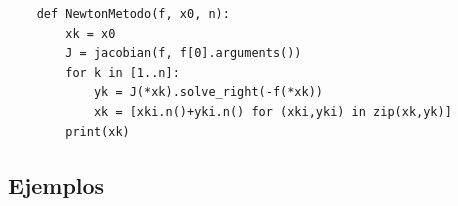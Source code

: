 

\begin{verbatim}
	def NewtonMetodo(f, x0, n):
		xk = x0
		J = jacobian(f, f[0].arguments())
		for k in [1..n]:
			yk = J(*xk).solve_right(-f(*xk))
			xk = [xki.n()+yki.n() for (xki,yki) in zip(xk,yk)]
		print(xk)
\end{verbatim}

\subsection{Ejemplos}

